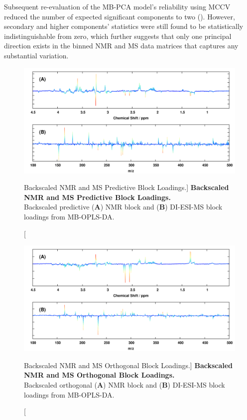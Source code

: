 \begin{doublespace}
Subsequent re-evaluation of the MB-PCA model's reliability using MCCV reduced
the number of expected significant components to two
(). However, secondary and higher
components' \qsq{} statistics were still found to be
statistically indistinguishable from zero, which further suggests that only
one principal direction exists in the binned NMR and MS data matrices that
captures any substantial variation.
\end{doublespace}

\begin{figure}[ht!]
\includegraphics[width=6.5in]{figs/apps/12-mbopls-p.png}
\caption
      [Backscaled NMR and MS Predictive Block Loadings.]{
  {\bf Backscaled NMR and MS Predictive Block Loadings.}
  \\
  Backscaled predictive ({\bf A}) \hnmr{} NMR block and ({\bf B}) DI-ESI-MS
  block loadings from MB-OPLS-DA.
}
\label{figure.4.12}
\end{figure}

\begin{figure}[ht!]
\includegraphics[width=6.5in]{figs/apps/13-mbopls-po.png}
\caption
      [Backscaled NMR and MS Orthogonal Block Loadings.]{
  {\bf Backscaled NMR and MS Orthogonal Block Loadings.}
  \\
  Backscaled orthogonal ({\bf A}) \hnmr{} NMR block and ({\bf B}) DI-ESI-MS
  block loadings from MB-OPLS-DA.
}
\label{figure.4.13}
\end{figure}

